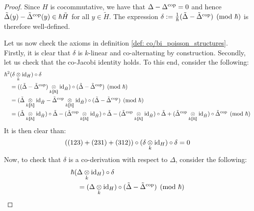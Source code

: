             \begin{proof}
                Since $H$ is cocommutative, we have that $\Delta - \Delta^{\mathrm{cop}} = 0$ and hence $\tilde{\Delta}(y) - \tilde{\Delta}^{\mathrm{cop}}(y) \in \hbar \tilde{H}$ for all $y \in \tilde{H}$. The expression $\delta := \frac{1}{\hbar}(\tilde{\Delta} - \tilde{\Delta}^{\mathrm{cop}}) \pmod{\hbar}$ is therefore well-defined.

                Let us now check the axioms in definition \ref{def: co/bi_poisson_structures}. Firstly, it is clear that $\delta$ is $k$-linear and co-alternating by construction. Secondly, let us check that the co-Jacobi identity holds. To this end, consider the following:
                    $$
                        \begin{aligned}
                            & \hbar^2 (\delta \tensor_k \id_H) \circ \delta
                            \\
                            & \quad = ( (\tilde{\Delta} - \tilde{\Delta}^{\cop}) \tensor_{k[\![\hbar]\!]} \id_{\tilde{H}} ) \circ (\tilde{\Delta} - \tilde{\Delta}^{\cop}) \pmod{\hbar}
                            \\
                            & \quad = ( \tilde{\Delta} \tensor_{k[\![\hbar]\!]} \id_{\tilde{H}} - \tilde{\Delta}^{\cop} \tensor_{k[\![\hbar]\!]} \id_{\tilde{H}} ) \circ (\tilde{\Delta} - \tilde{\Delta}^{\cop}) \pmod{\hbar}
                            \\
                            & \quad = (\tilde{\Delta} \tensor_{k[\![\hbar]\!]} \id_{\tilde{H}}) \circ \tilde{\Delta} - (\tilde{\Delta}^{\cop} \tensor_{k[\![\hbar]\!]} \id_{\tilde{H}}) \circ \tilde{\Delta} - (\tilde{\Delta}^{\cop} \tensor_{k[\![\hbar]\!]} \id_{\tilde{H}}) \circ \tilde{\Delta} + (\tilde{\Delta}^{\cop} \tensor_{k[\![\hbar]\!]} \id_{\tilde{H}}) \circ \tilde{\Delta}^{\cop} \pmod{\hbar}
                        \end{aligned}
                    $$
                It is then clear than:
                    $$((123) + (231) + (312)) \circ (\delta \tensor_k \id_H) \circ \delta = 0$$
                Now, to check that $\delta$ is a co-derivation with respect to $\Delta$, consider the following:
                    $$
                        \begin{aligned}
                            & \hbar (\Delta \tensor_k \id_H) \circ \delta 
                            \\
                            & \quad = (\Delta \tensor_k \id_H) \circ (\tilde{\Delta} - \tilde{\Delta}^{\cop}) \pmod{\hbar} 

\end{aligned}$$
\end{proof}
